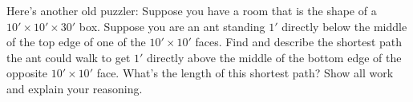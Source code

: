 \documentclass[noauthor,nooutcomes,hints,handout,12pt]{ximera}
\begin{document}
\begin{question}
  Here's another old puzzler: Suppose you have a room that is the
  shape of a $10'\times 10' \times 30'$ box. Suppose you are an ant
  standing $1'$ directly below the middle of the top edge of one of
  the $10'\times 10'$ faces.  Find and describe the shortest path the
  ant could walk to get $1'$ directly above the middle of the bottom
  edge of the opposite $10'\times10'$ face.  What's the length of this
  shortest path? Show all work and explain your reasoning.

\end{question}
\end{document}
